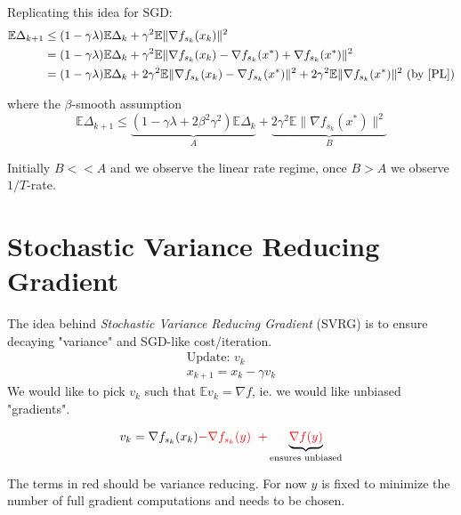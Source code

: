 \documentclass[12pt]{report}
\def \E{\mathbb E}
\begin{document}
Replicating this idea for SGD:
\begin{align*}
\E \Delta_{k+1} & \le  (1- \gamma \lambda)\E \Delta _k +\gamma^2 \E \| \nabla f_{s_k} (x_k)\|^2 \\
 & =  (1- \gamma \lambda)\E \Delta _k +\gamma^2 \E \| \nabla f_{s_k} (x_k) - \nabla f_{s_k}(x^*) +\nabla f_{s_k}(x^*) \|^2 \\
& = (1- \gamma \lambda)\E \Delta _k +2\gamma^2 \E \| \nabla f_{s_k} (x_k) - \nabla f_{s_k}(x^*) \|^2 +2\gamma^2 \E \|\nabla f_{s_k}(x^*)\|^2 \text{ (by \ref{PL})}
\end{align*}

where the $\beta$-smooth assumption 
\begin{equation}
\E \Delta_{k+1}  \le \underbrace{(1- \gamma \lambda+2\beta^2 \gamma^2)\E \Delta _k}_{A} + \underbrace{2\gamma^2 \E \|\nabla f_{s_k}(x^*)\|^2}_{B}
\end{equation}

Initially $B<<A$ and we observe the linear rate regime, once $B>A$ we observe $1/T$-rate.




\section{Stochastic Variance Reducing Gradient}

The idea behind \textit{Stochastic Variance Reducing Gradient} (SVRG) is to ensure decaying "variance" and SGD-like cost/iteration.
\begin{align*}
\text{Update: }v_k \\
x_{k+1} = x_k - \gamma v_k
\end{align*}
We would like to pick $v_k$ such that $\E v_k = \nabla f$, ie. we would like unbiased "gradients".

$$ v_k = \nabla f_{s_k}(x_k) \textcolor{red}{ - \nabla f_{s_k}(y)\;\;+} \underbrace{\textcolor{red}{\nabla f(y)}}_{\text{ensures unbiased}}$$

The terms in red should be variance reducing. For now $y$ is fixed to minimize the number of full gradient computations and needs to be chosen.
\end{document}

